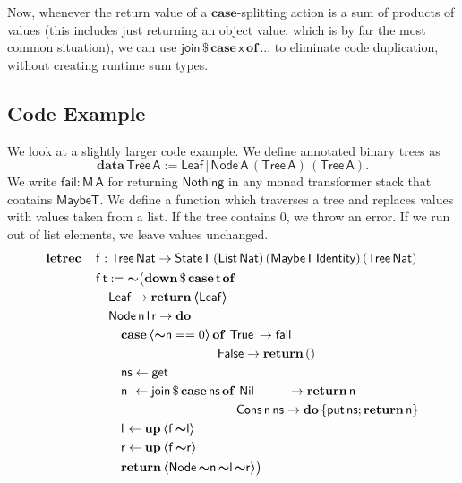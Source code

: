 \documentclass[acmsmall,screen,review,anonymous]{acmart}
\newcommand{\mit}[1]{{\mathsf{#1}}}
\newcommand{\msf}[1]{{\mathsf{#1}}}
\newcommand{\mbf}[1]{{\mathbf{#1}}}
\newcommand{\bs}[1]{\boldsymbol{#1}}
\newcommand{\mdo}{\mbf{do}\,}
\newcommand{\ind}{\hspace{1em}}
\newcommand{\return}{\mbf{return}\,}
\newcommand{\data}{\mbf{data}\,}
\newcommand{\letrec}{\mbf{letrec}\,}
\newcommand{\of}{\mbf{of}\,}
\newcommand{\vn}{\mathsf{n}}
\newcommand{\vA}{\mathsf{A}}
\newcommand{\vx}{\mathsf{x}}
\newcommand{\vf}{\mathsf{f}}
\newcommand{\vt}{\mathsf{t}}
\newcommand{\vr}{\mathsf{r}}
\newcommand{\vl}{\mathsf{l}}
\newcommand{\vns}{\mathsf{ns}}
\newcommand{\List}{\msf{List}}
\newcommand{\Tree}{\msf{Tree}}
\newcommand{\Node}{\msf{Node}}
\newcommand{\Leaf}{\msf{Leaf}}
\newcommand{\Nil}{\msf{Nil}}
\newcommand{\Cons}{\msf{Cons}}
\newcommand{\fro}{\leftarrow}
\newcommand{\case}{\mbf{case\,}}
\newcommand{\spl}{{\bs{\sim}}}
\newcommand{\ql}{{\bs{\langle}}}
\newcommand{\qr}{{\bs{\rangle}}}
\newcommand{\True}{\msf{True}}
\newcommand{\False}{\msf{False}}
\newcommand{\Nat}{\msf{Nat}}
\newcommand{\MaybeT}{\msf{MaybeT}}
\newcommand{\Nothing}{\msf{Nothing}}
\theoremstyle{remark}
\newcommand{\mup}{\mbf{up}}
\newcommand{\mdown}{\mbf{down}}
\newcommand{\qt}[1]{\ql#1\qr}
\newcommand{\StateT}{\msf{StateT}}
\newcommand{\Identity}{\msf{Identity}}
\newcommand{\dlr}{\,\$\,}
\newcommand{\join}{\mit{join}}
\newcommand{\get}{\mit{get}}
\begin{document}
Now, whenever the return value of a $\mbf{case}$-splitting action is a sum of
products of values (this includes just returning an object value, which is by
far the most common situation), we can use $\join \dlr \case \vx\,\of ...$ to
eliminate code duplication, without creating runtime sum types.

\subsection{Code Example}

We look at a slightly larger code example. We define annotated binary trees as
\[ \data \Tree\,\vA := \Leaf\,|\,\Node\,\vA\,(\Tree\,\vA)\,(\Tree\,\vA). \]
We write $\msf{fail : M\,A}$ for returning $\Nothing$ in any monad transformer
stack that contains $\MaybeT$. We define a function which traverses a tree and
replaces values with values taken from a list. If the tree contains $0$, we
throw an error. If we run out of list elements, we leave values unchanged.
\begin{alignat*}{4}
  &  \letrec &&\vf : \Tree\,\Nat \to \StateT\,(\List\,\Nat)\,(\MaybeT\,\Identity)\,(\Tree\,\Nat) \\
  &          &&\vf\,\vt := \spl \big(\mdown \dlr \case \vt\,\of\\
  &          &&\ind \Leaf \to \return \qt{\Leaf} \\
  &          &&\ind \Node\,\vn\,\vl\,\vr \to \mdo\\
  &          &&\ind \ind \case \qt{\spl \vn == 0}\,\of\,\True \hspace{0.2em}\to \msf{fail}\\
  &          &&\ind \ind \ind \hspace{6.7em}             \False \to \return () \\
  &          &&\ind \ind \vns \fro \get \\
  &          &&\ind \ind \vn\hspace{0.35em}\fro\join \dlr \case \vns\,\of\,\Nil \hspace{2.65em}\to \return \vn \\
  &          &&\ind \ind \ind \hspace{8.2em}\Cons\,\vn\,\vns \to \mdo \{\msf{put}\,\vns; \return \vn\} \\
  &          &&\ind \ind \vl\hspace{0.1em} \fro \mup\,\qt{\vf\,\spl \vl} \\
  &          &&\ind \ind \vr \fro \mup\,\qt{\vf\,\spl \vr} \\
  &          &&\ind \ind \return \qt{\Node\,\spl \vn\,\spl \vl\,\spl \vr}\big)
\end{alignat*}
\end{document}
